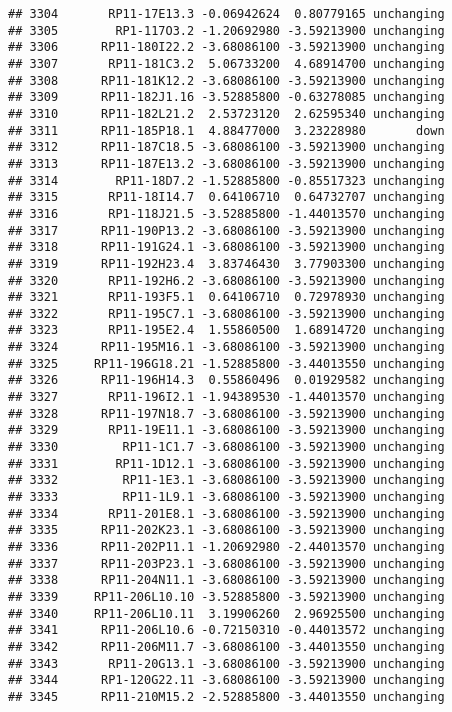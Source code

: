 \documentclass[]{article}
\begin{document}
\begin{verbatim}
## 3304       RP11-17E13.3 -0.06942624  0.80779165 unchanging
## 3305        RP1-117O3.2 -1.20692980 -3.59213900 unchanging
## 3306      RP11-180I22.2 -3.68086100 -3.59213900 unchanging
## 3307       RP11-181C3.2  5.06733200  4.68914700 unchanging
## 3308      RP11-181K12.2 -3.68086100 -3.59213900 unchanging
## 3309      RP11-182J1.16 -3.52885800 -0.63278085 unchanging
## 3310      RP11-182L21.2  2.53723120  2.62595340 unchanging
## 3311      RP11-185P18.1  4.88477000  3.23228980       down
## 3312      RP11-187C18.5 -3.68086100 -3.59213900 unchanging
## 3313      RP11-187E13.2 -3.68086100 -3.59213900 unchanging
## 3314        RP11-18D7.2 -1.52885800 -0.85517323 unchanging
## 3315       RP11-18I14.7  0.64106710  0.64732707 unchanging
## 3316       RP1-118J21.5 -3.52885800 -1.44013570 unchanging
## 3317      RP11-190P13.2 -3.68086100 -3.59213900 unchanging
## 3318      RP11-191G24.1 -3.68086100 -3.59213900 unchanging
## 3319      RP11-192H23.4  3.83746430  3.77903300 unchanging
## 3320       RP11-192H6.2 -3.68086100 -3.59213900 unchanging
## 3321       RP11-193F5.1  0.64106710  0.72978930 unchanging
## 3322       RP11-195C7.1 -3.68086100 -3.59213900 unchanging
## 3323       RP11-195E2.4  1.55860500  1.68914720 unchanging
## 3324      RP11-195M16.1 -3.68086100 -3.59213900 unchanging
## 3325     RP11-196G18.21 -1.52885800 -3.44013550 unchanging
## 3326      RP11-196H14.3  0.55860496  0.01929582 unchanging
## 3327       RP11-196I2.1 -1.94389530 -1.44013570 unchanging
## 3328      RP11-197N18.7 -3.68086100 -3.59213900 unchanging
## 3329       RP11-19E11.1 -3.68086100 -3.59213900 unchanging
## 3330         RP11-1C1.7 -3.68086100 -3.59213900 unchanging
## 3331        RP11-1D12.1 -3.68086100 -3.59213900 unchanging
## 3332         RP11-1E3.1 -3.68086100 -3.59213900 unchanging
## 3333         RP11-1L9.1 -3.68086100 -3.59213900 unchanging
## 3334       RP11-201E8.1 -3.68086100 -3.59213900 unchanging
## 3335      RP11-202K23.1 -3.68086100 -3.59213900 unchanging
## 3336      RP11-202P11.1 -1.20692980 -2.44013570 unchanging
## 3337      RP11-203P23.1 -3.68086100 -3.59213900 unchanging
## 3338      RP11-204N11.1 -3.68086100 -3.59213900 unchanging
## 3339     RP11-206L10.10 -3.52885800 -3.59213900 unchanging
## 3340     RP11-206L10.11  3.19906260  2.96925500 unchanging
## 3341      RP11-206L10.6 -0.72150310 -0.44013572 unchanging
## 3342      RP11-206M11.7 -3.68086100 -3.44013550 unchanging
## 3343       RP11-20G13.1 -3.68086100 -3.59213900 unchanging
## 3344      RP1-120G22.11 -3.68086100 -3.59213900 unchanging
## 3345      RP11-210M15.2 -2.52885800 -3.44013550 unchanging

\end{verbatim}
\end{document}
